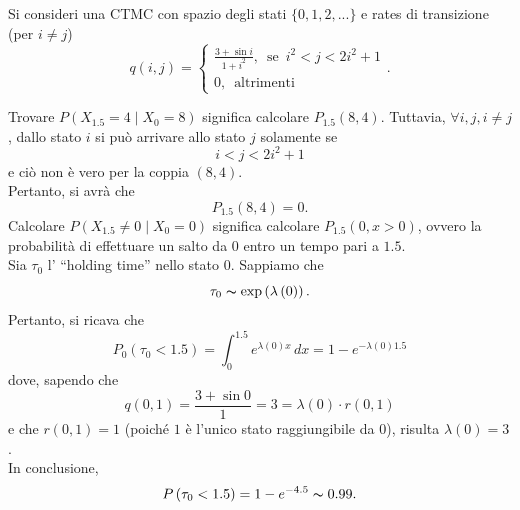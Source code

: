 \documentclass[11pt,largemargins]{homework}
\begin{document}
\section{}%
Si consideri una CTMC con spazio degli stati $\{0,1,2,...\}$ e rates di transizione (per $i\neq j$)
\begin{equation*}
q\left(i,j\right)=\begin{cases}\frac{3+\sin{i}}{1+i^{2}},\,\,\,\text{se}\,\,\,i^{2}<j<2i^{2}+1\\0, \,\,\,\text{altrimenti}\end{cases}.
\end{equation*}
\begin{alphaparts}
\questionpart
Trovare $P\left(X_{1.5}=4 \mid X_{0}=8\right)$ significa calcolare $P_{1.5}\left(8,4\right)$. Tuttavia, $\forall i,j, i\neq j$, dallo stato $i$ si può arrivare allo stato $j$ solamente se 
\begin{equation*}
i<j<2i^{2}+1
\end{equation*}
e ciò non è vero per la coppia $\left(8,4\right)$.\\
Pertanto, si avrà che
\begin{equation*}
P_{1.5}\left(8,4\right)=0.
\end{equation*}
\questionpart
Calcolare $P\left(X_{1.5}\neq 0 \mid X_{0}=0\right)$ significa calcolare $P_{1.5}\left(0,x>0\right)$, ovvero la probabilità di effettuare un salto da $0$ entro un tempo pari a $1.5$.\\
Sia $\tau_{0}$ l' ``holding time'' nello stato $0$. Sappiamo che
\begin{equation*}
\tau_{0}\thicksim \text{exp}\left(\lambda\left(0\right)\right).
\end{equation*}
Pertanto, si ricava che
\begin{equation*}
P_{0}\left(\tau_{0}<1.5\right)=\int_{0}^{1.5} e^{\lambda\left(0\right)x} \,dx= 1 - e^{-\lambda\left(0\right)1.5}
\end{equation*}
dove, sapendo che
\begin{equation*}
q\left(0,1\right)=\frac{3+\sin{0}}{1}=3=\lambda\left(0\right)\cdot r\left(0,1\right)
\end{equation*}
e che $r\left(0,1\right)=1$ (poiché $1$ è l'unico stato raggiungibile da $0$), risulta $\lambda\left(0\right)=3$.\\
In conclusione,
\begin{equation*}
P\left(\tau_{0}<1.5\right)=1-e^{-4.5}\thicksim 0.99.
\end{equation*}

\end{alphaparts}
\end{document}
